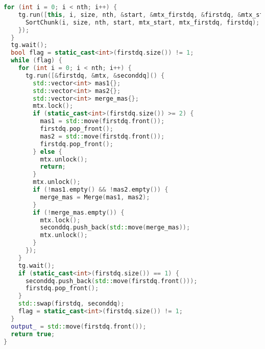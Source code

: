 \documentclass[a4paper,12pt]{article}
\begin{document}
\begin{lstlisting}[language=C++,caption={Фрагмент TBB-версии}]
  for (int i = 0; i < nth; i++) {
    tg.run([this, i, size, nth, &start, &mtx_firstdq, &firstdq, &mtx_start]() {
      SortChunk(i, size, nth, start, mtx_start, mtx_firstdq, firstdq);
    });
  }
  tg.wait();
  bool flag = static_cast<int>(firstdq.size()) != 1;
  while (flag) {
    for (int i = 0; i < nth; i++) {
      tg.run([&firstdq, &mtx, &seconddq]() {
        std::vector<int> mas1{};
        std::vector<int> mas2{};
        std::vector<int> merge_mas{};
        mtx.lock();
        if (static_cast<int>(firstdq.size()) >= 2) {
          mas1 = std::move(firstdq.front());
          firstdq.pop_front();
          mas2 = std::move(firstdq.front());
          firstdq.pop_front();
        } else {
          mtx.unlock();
          return;
        }
        mtx.unlock();
        if (!mas1.empty() && !mas2.empty()) {
          merge_mas = Merge(mas1, mas2);
        }
        if (!merge_mas.empty()) {
          mtx.lock();
          seconddq.push_back(std::move(merge_mas));
          mtx.unlock();
        }
      });
    }
    tg.wait();
    if (static_cast<int>(firstdq.size()) == 1) {
      seconddq.push_back(std::move(firstdq.front()));
      firstdq.pop_front();
    }
    std::swap(firstdq, seconddq);
    flag = static_cast<int>(firstdq.size()) != 1;
  }
  output_ = std::move(firstdq.front());
  return true;
}
\end{lstlisting}
\end{document}
